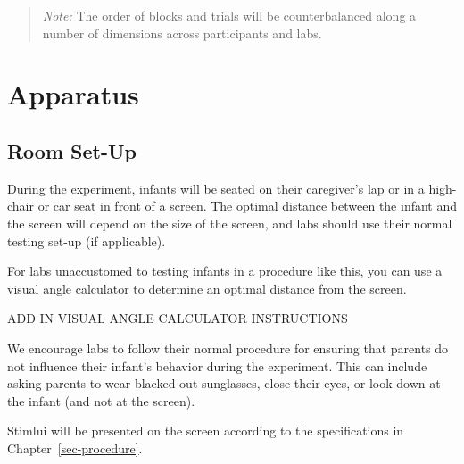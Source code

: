 \documentclass[
  letterpaper,
  DIV=11,
  numbers=noendperiod,
  oneside]{scrreprt}
\begin{document}
\begin{quote}
\emph{Note:} The order of blocks and trials will be counterbalanced
along a number of dimensions across participants and labs.
\end{quote}

\chapter{Apparatus}\label{sec-apparatus}

\section{Room Set-Up}\label{room-set-up}

During the experiment, infants will be seated on their caregiver's lap
or in a high-chair or car seat in front of a screen. The optimal distance
between the infant and the screen will depend on the size of the screen,
and labs should use their normal testing set-up (if applicable).

For labs unaccustomed to testing infants in a procedure like this, you
can use a visual angle calculator to determine an optimal distance from
the screen.

\begin{tcolorbox}[enhanced jigsaw, coltitle=black, colframe=quarto-callout-caution-color-frame, titlerule=0mm, colback=white, arc=.35mm, toprule=.15mm, left=2mm, colbacktitle=quarto-callout-caution-color!10!white, opacityback=0, bottomtitle=1mm, title=\textcolor{quarto-callout-caution-color}{\faFire}\hspace{0.5em}{Caution}, breakable, rightrule=.15mm, opacitybacktitle=0.6, toptitle=1mm, leftrule=.75mm, bottomrule=.15mm]

ADD IN VISUAL ANGLE CALCULATOR INSTRUCTIONS

\end{tcolorbox}

We encourage labs to follow their normal procedure for ensuring that
parents do not influence their infant's behavior during the experiment.
This can include asking parents to wear blacked-out sunglasses, close
their eyes, or look down at the infant (and not at the screen).

Stimlui will be presented on the screen according to the specifications
in Chapter~\ref{sec-procedure}.
\end{document}
